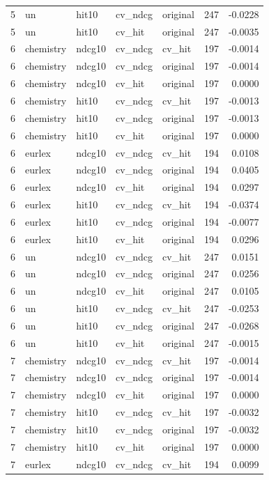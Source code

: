 \begin{tabular}{rllllrr}
5 & un & hit10 & cv\_ndcg & original & 247 & -0.0228 \\
5 & un & hit10 & cv\_hit & original & 247 & -0.0035 \\
6 & chemistry & ndcg10 & cv\_ndcg & cv\_hit & 197 & -0.0014 \\
6 & chemistry & ndcg10 & cv\_ndcg & original & 197 & -0.0014 \\
6 & chemistry & ndcg10 & cv\_hit & original & 197 & 0.0000 \\
6 & chemistry & hit10 & cv\_ndcg & cv\_hit & 197 & -0.0013 \\
6 & chemistry & hit10 & cv\_ndcg & original & 197 & -0.0013 \\
6 & chemistry & hit10 & cv\_hit & original & 197 & 0.0000 \\
6 & eurlex & ndcg10 & cv\_ndcg & cv\_hit & 194 & 0.0108 \\
6 & eurlex & ndcg10 & cv\_ndcg & original & 194 & 0.0405 \\
6 & eurlex & ndcg10 & cv\_hit & original & 194 & 0.0297 \\
6 & eurlex & hit10 & cv\_ndcg & cv\_hit & 194 & -0.0374 \\
6 & eurlex & hit10 & cv\_ndcg & original & 194 & -0.0077 \\
6 & eurlex & hit10 & cv\_hit & original & 194 & 0.0296 \\
6 & un & ndcg10 & cv\_ndcg & cv\_hit & 247 & 0.0151 \\
6 & un & ndcg10 & cv\_ndcg & original & 247 & 0.0256 \\
6 & un & ndcg10 & cv\_hit & original & 247 & 0.0105 \\
6 & un & hit10 & cv\_ndcg & cv\_hit & 247 & -0.0253 \\
6 & un & hit10 & cv\_ndcg & original & 247 & -0.0268 \\
6 & un & hit10 & cv\_hit & original & 247 & -0.0015 \\
7 & chemistry & ndcg10 & cv\_ndcg & cv\_hit & 197 & -0.0014 \\
7 & chemistry & ndcg10 & cv\_ndcg & original & 197 & -0.0014 \\
7 & chemistry & ndcg10 & cv\_hit & original & 197 & 0.0000 \\
7 & chemistry & hit10 & cv\_ndcg & cv\_hit & 197 & -0.0032 \\
7 & chemistry & hit10 & cv\_ndcg & original & 197 & -0.0032 \\
7 & chemistry & hit10 & cv\_hit & original & 197 & 0.0000 \\
7 & eurlex & ndcg10 & cv\_ndcg & cv\_hit & 194 & 0.0099 \\

\end{tabular}
